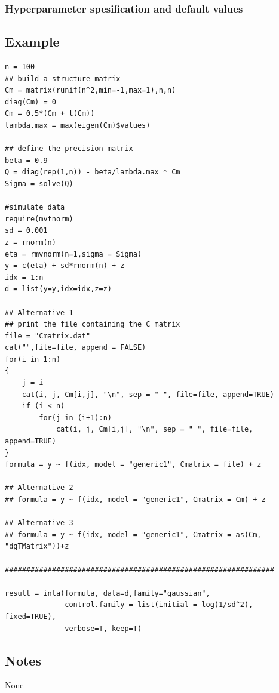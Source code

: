 \documentclass[a4paper,11pt]{article}
\begin{document}
\subsubsection*{Hyperparameter spesification and default values}



\subsection*{Example}
\begin{verbatim}
n = 100
## build a structure matrix
Cm = matrix(runif(n^2,min=-1,max=1),n,n)
diag(Cm) = 0
Cm = 0.5*(Cm + t(Cm))
lambda.max = max(eigen(Cm)$values)

## define the precision matrix
beta = 0.9
Q = diag(rep(1,n)) - beta/lambda.max * Cm
Sigma = solve(Q)

#simulate data
require(mvtnorm)
sd = 0.001
z = rnorm(n)
eta = rmvnorm(n=1,sigma = Sigma)
y = c(eta) + sd*rnorm(n) + z
idx = 1:n
d = list(y=y,idx=idx,z=z)

## Alternative 1
## print the file containing the C matrix
file = "Cmatrix.dat"
cat("",file=file, append = FALSE)
for(i in 1:n)
{
    j = i
    cat(i, j, Cm[i,j], "\n", sep = " ", file=file, append=TRUE)
    if (i < n)
        for(j in (i+1):n)
            cat(i, j, Cm[i,j], "\n", sep = " ", file=file, append=TRUE)
}
formula = y ~ f(idx, model = "generic1", Cmatrix = file) + z

## Alternative 2
## formula = y ~ f(idx, model = "generic1", Cmatrix = Cm) + z

## Alternative 3
## formula = y ~ f(idx, model = "generic1", Cmatrix = as(Cm, "dgTMatrix"))+z

###############################################################

result = inla(formula, data=d,family="gaussian",
              control.family = list(initial = log(1/sd^2), fixed=TRUE),
              verbose=T, keep=T)
\end{verbatim}

\subsection*{Notes}
None
\end{document}
